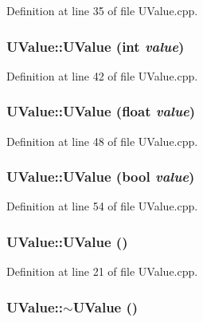 Definition at line 35 of file UValue.cpp.\hypertarget{class_u_value_21b92c2b01558e7f05d7295e27405743}{
\subsubsection[{UValue}]{\setlength{\rightskip}{0pt plus 5cm}UValue::UValue (int {\em value})}}
\label{class_u_value_21b92c2b01558e7f05d7295e27405743}




Definition at line 42 of file UValue.cpp.\hypertarget{class_u_value_04e29a0afddf2126d156249d7879e82a}{
\subsubsection[{UValue}]{\setlength{\rightskip}{0pt plus 5cm}UValue::UValue (float {\em value})}}
\label{class_u_value_04e29a0afddf2126d156249d7879e82a}




Definition at line 48 of file UValue.cpp.\hypertarget{class_u_value_c636dcb8f6a524eb22d26f59e05d49c4}{
\subsubsection[{UValue}]{\setlength{\rightskip}{0pt plus 5cm}UValue::UValue (bool {\em value})}}
\label{class_u_value_c636dcb8f6a524eb22d26f59e05d49c4}




Definition at line 54 of file UValue.cpp.\hypertarget{class_u_value_701470f74bf0f27de71cd6485c192393}{
\subsubsection[{UValue}]{\setlength{\rightskip}{0pt plus 5cm}UValue::UValue ()}}
\label{class_u_value_701470f74bf0f27de71cd6485c192393}




Definition at line 21 of file UValue.cpp.\hypertarget{class_u_value_715559362386081f5f5f4c58926d62e2}{
\subsubsection[{$\sim$UValue}]{\setlength{\rightskip}{0pt plus 5cm}UValue::$\sim$UValue ()}}
\label{class_u_value_715559362386081f5f5f4c58926d62e2}




